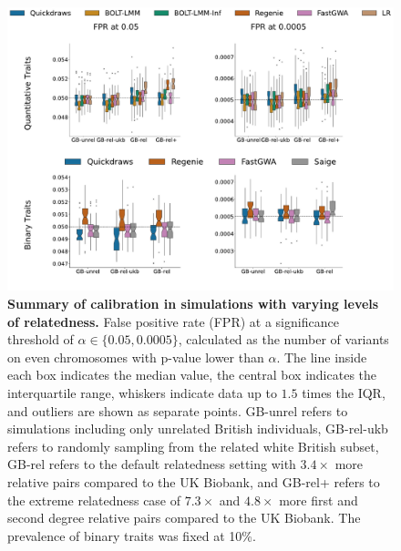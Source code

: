 \begin{figure}[h!]
    \centering
    \includegraphics[width=\textwidth]{figures/sim_calibration/relatedness_fpr.pdf}
    \caption{\textbf{Summary of calibration in simulations with varying levels of relatedness.}
    False positive rate (FPR) at a significance threshold of $\alpha \in \{0.05, 0.0005\}$, calculated as the number of variants on even chromosomes with p-value lower than $\alpha$.
    The line inside each box indicates the median value, the central box indicates the interquartile range, whiskers indicate data up to $1.5$ times the IQR, and outliers are shown as separate points.
    GB-unrel refers to simulations including only unrelated British individuals, GB-rel-ukb refers to randomly sampling from the related white British subset, GB-rel refers to the default relatedness setting with $3.4 \times$ more relative pairs compared to the UK Biobank, and GB-rel+ refers to the extreme relatedness case of $7.3 \times$ and $4.8 \times$ more first and second degree relative pairs compared to the UK Biobank.
    The prevalence of binary traits was fixed at 10\%.
    }
    \label{fig:sim_calib_rel}
\end{figure}

